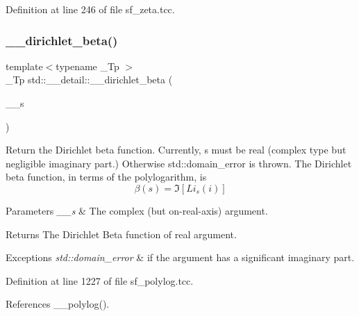 Definition at line 246 of file sf\+\_\+zeta.\+tcc.

\mbox{\label{namespacestd_1_1____detail_ad0c8e975438d30cbfb5cad91f3ac6d01}} 
\subsubsection{\texorpdfstring{\+\_\+\+\_\+dirichlet\+\_\+beta()}{\_\_dirichlet\_beta()}\hspace{0.1cm}{\footnotesize\ttfamily [1/2]}}
{\footnotesize\ttfamily template$<$typename \+\_\+\+Tp $>$ \\
\+\_\+\+Tp std\+::\+\_\+\+\_\+detail\+::\+\_\+\+\_\+dirichlet\+\_\+beta (\begin{DoxyParamCaption}\item[{std\+::complex$<$ \+\_\+\+Tp $>$}]{\+\_\+\+\_\+s }\end{DoxyParamCaption})}

Return the Dirichlet beta function. Currently, s must be real (complex type but negligible imaginary part.) Otherwise std\+::domain\+\_\+error is thrown. The Dirichlet beta function, in terms of the polylogarithm, is \[ \beta(s) = \Im[Li_s(i)] \]


\begin{DoxyParams}{Parameters}
{\em \+\_\+\+\_\+s} & The complex (but on-\/real-\/axis) argument. \\
\hline
\end{DoxyParams}
\begin{DoxyReturn}{Returns}
The Dirichlet Beta function of real argument. 
\end{DoxyReturn}

\begin{DoxyExceptions}{Exceptions}
{\em std\+::domain\+\_\+error} & if the argument has a significant imaginary part. \\
\hline
\end{DoxyExceptions}


Definition at line 1227 of file sf\+\_\+polylog.\+tcc.



References \+\_\+\+\_\+polylog().

\mbox{\label{namespacestd_1_1____detail_a2e4243f8d092d48e16fc45ba0c4e9489}} 

